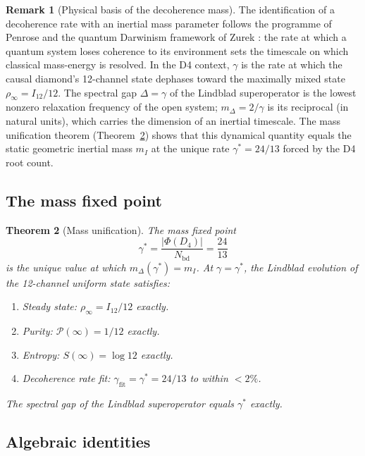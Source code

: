 \documentclass[12pt,a4paper]{article}
\theoremstyle{plain}
\newtheorem{theorem}{Theorem}[section]
\theoremstyle{definition}
\newtheorem{remark}[theorem]{Remark}
\newcommand{\gstar}{\gamma^{*}}
\begin{document}
\begin{remark}[Physical basis of the decoherence mass]
  The identification of a decoherence rate with an inertial mass parameter
  follows the programme of Penrose \cite{Penrose1996} and the quantum
  Darwinism framework of Zurek \cite{Zurek2003}: the rate at which a
  quantum system loses coherence to its environment sets the timescale
  on which classical mass-energy is resolved.  In the D4 context,
  $\gamma$ is the rate at which the causal diamond's 12-channel state
  dephases toward the maximally mixed state $\rho_\infty = I_{12}/12$.
  The spectral gap $\Delta = \gamma$ of the Lindblad superoperator
  is the lowest nonzero relaxation frequency of the open system;
  $m_\Delta = 2/\gamma$ is its reciprocal (in natural units), which
  carries the dimension of an inertial timescale.  The mass unification
  theorem (Theorem~\ref{thm:mass}) shows that this dynamical quantity
  equals the static geometric inertial mass $m_I$ at the unique rate
  $\gstar = 24/13$ forced by the D4 root count.
\end{remark}

\subsection{The mass fixed point}

\begin{theorem}[Mass unification]
\label{thm:mass}
  The mass fixed point
  \begin{equation}
    \gstar = \frac{|\Phi(D_4)|}{N_{\mathrm{bd}}} = \frac{24}{13}
    \label{eq:gammastar}
  \end{equation}
  is the unique value at which $m_\Delta(\gstar) = m_I$.
  At $\gamma = \gstar$, the Lindblad evolution of the 12-channel uniform
  state satisfies:
  \begin{enumerate}[label=(\alph*)]
    \item Steady state: $\rho_\infty = I_{12}/12$ exactly.
    \item Purity: $\mathcal{P}(\infty) = 1/12$ exactly.
    \item Entropy: $S(\infty) = \log 12$ exactly.
    \item Decoherence rate fit: $\gamma_{\mathrm{fit}} = \gstar = 24/13$
      to within $< 2\%$.
  \end{enumerate}
  The spectral gap of the Lindblad superoperator equals $\gstar$ exactly.
\end{theorem}

\subsection{Algebraic identities}
\end{document}
